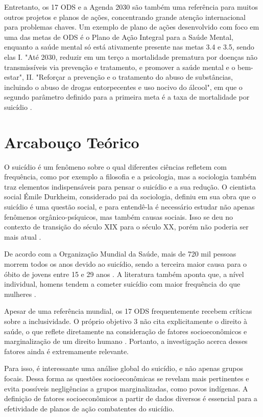 \documentclass[letterpaper]{article}
\begin{document}
Entretanto, os 17 ODS e a Agenda 2030 são também uma referência para muitos outros projetos e planos de ações, concentrando grande atenção internacional para problemas chaves. Um exemplo de plano de ações desenvolvido com foco em uma das metas de ODS é o Plano de Ação Integral para a Saúde Mental, enquanto a saúde mental só está ativamente presente nas metas 3.4 e 3.5, sendo elas I. "Até 2030, reduzir em um terço a mortalidade prematura por doenças não transmissíveis via prevenção e tratamento, e promover a saúde mental e o bem-estar", II. "Reforçar a prevenção e o tratamento do abuso de substâncias, incluindo o abuso de drogas entorpecentes e uso nocivo do álcool", em que o segundo parâmetro definido para a primeira meta é a taxa de mortalidade por suicídio \cite{unagenda2030}.

\section{Arcabouço Teórico} %

O suicídio é um fenômeno sobre o qual diferentes ciências refletem com frequência, como por exemplo a filosofia e a psicologia, mas a sociologia também traz elementos indispensáveis para pensar o suicídio e a sua redução. O cientista social Émile Durkheim, considerado pai da sociologia, definiu em sua obra que o suicídio é uma questão social, e para entendê-la é necessário estudar não apenas fenômenos orgânico-psíquicos, mas também causas sociais. Isso se deu no contexto de transição do século XIX para o século XX, porém não poderia ser mais atual \cite{sociologia}.

De acordo com a Organização Mundial da Saúde, mais de 720 mil pessoas morrem todos os anos devido ao suicídio, sendo a terceira maior causa para o óbito de jovens entre 15 e 29 anos \cite{whosuicide}. A literatura também aponta que, a nível individual, homens tendem a cometer suicídio com maior frequência do que mulheres \cite{whosuicide_gender}.

Apesar de uma referência mundial, os 17 ODS frequentemente recebem críticas sobre a inclusividade. O próprio objetivo 3 não cita explicitamente o direito à saúde, o que reflete diretamente na consideração de fatores socioeconômicos e marginalização de um direito humano \cite{antiods}. Portanto, a investigação acerca desses fatores ainda é extremamente relevante.

Para isso, é interessante uma análise global do suicídio, e não apenas grupos focais. Dessa forma as questões socioeconômicas se revelam mais pertinentes e evita possíveis negligências a grupos marginalizadas, como povos indígenas. A definição de fatores socioeconômicos a partir de dados diversos é essencial para a efetividade de planos de ação combatentes do suicídio.
\end{document}
